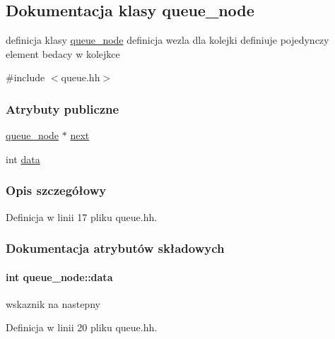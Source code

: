 \hypertarget{classqueue__node}{}\subsection{Dokumentacja klasy queue\+\_\+node}
\label{classqueue__node}


definicja klasy \hyperlink{classqueue__node}{queue\+\_\+node} definicja wezla dla kolejki definiuje pojedynczy element bedacy w kolejkce  




{\ttfamily \#include $<$queue.\+hh$>$}

\subsubsection*{Atrybuty publiczne}
\begin{DoxyCompactItemize}
\item 
\hyperlink{classqueue__node}{queue\+\_\+node} $\ast$ \hyperlink{classqueue__node_ae882ea3a1a117ff5c2a30cbd148ff1d4}{next}
\item 
int \hyperlink{classqueue__node_abe6e8dcb964c423bccb83c6b784124e7}{data}
\end{DoxyCompactItemize}


\subsubsection{Opis szczegółowy}


Definicja w linii 17 pliku queue.\+hh.



\subsubsection{Dokumentacja atrybutów składowych}
\hypertarget{classqueue__node_abe6e8dcb964c423bccb83c6b784124e7}{}
\paragraph[{data}]{\setlength{\rightskip}{0pt plus 5cm}int queue\+\_\+node\+::data}\label{classqueue__node_abe6e8dcb964c423bccb83c6b784124e7}
wskaznik na nastepny 

Definicja w linii 20 pliku queue.\+hh.

\hypertarget{classqueue__node_ae882ea3a1a117ff5c2a30cbd148ff1d4}{}
